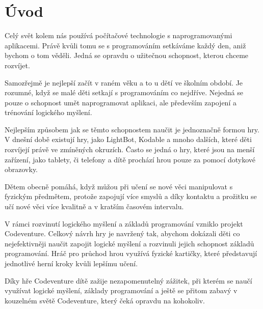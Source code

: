 \chapter{Úvod}

Celý svět kolem nás používá počítačové technologie s naprogramovanými aplikacemi. Právě kvůli tomu se s programováním setkáváme každý den, aniž bychom o tom věděli. Jedná se opravdu o užitečnou schopnost, kterou chceme rozvíjet.\par Samozřejmě je nejlepší začít v raném věku a to u dětí ve školním období. Je rozumné, když se malé děti setkají s programováním co nejdříve. Nejedná se pouze o schopnost umět naprogramovat aplikaci, ale především zapojení a trénování logického myšlení.\par Nejlepším způsobem jak se těmto schopnostem naučit je jednoznačně formou hry. V dnešní době existují hry, jako LightBot, Kodable a mnoho dalších, které děti rozvíjejí právě ve zmíněných okruzích. Často se jedná o hry, které jsou na menší zařízení, jako tablety, či telefony a dítě prochází hrou pouze za pomocí dotykové obrazovky.\par Dětem obecně pomáhá, když můžou při učení se nové věci manipulovat s fyzickým předmětem, protože zapojují více smyslů a díky kontaktu a prožitku se učí nové věci více kvalitně a v kratším časovém intervalu.\par V rámci rozvinutí logického myšlení a základů programování vzniklo projekt Codeventure. Celkový návrh hry je navržený tak, abychom dokázali děti co nejefektivněji naučit zapojit logické myšlení a rozvinuli jejich schopnost základů programování. Hráč pro průchod hrou využívá fyzické kartičky, které představují jednotlivé herní kroky kvůli lepšímu učení.\par Díky hře Codeventure dítě zažije nezapomenutelný zážitek, při kterém se naučí využívat logické myšlení, základy programování a ještě se přitom zabavý v kouzelném světě Codeventure, který čeká opravdu na kohokoliv.